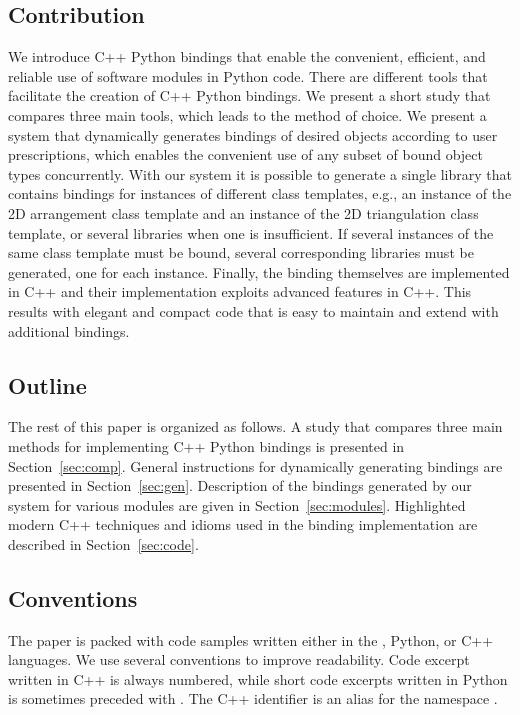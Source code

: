 \subsection{Contribution}
\label{ssec:intro:results}
We introduce C++ Python bindings that enable the convenient,
efficient, and reliable use of \cgal{} software modules in Python
code. There are different tools that facilitate the creation of C++
Python bindings. We present a short study that compares three main
tools, which leads to the method of choice.
%
We present a system that dynamically generates bindings of desired
objects according to user prescriptions, which enables the convenient
use of any subset of bound object types concurrently.  With our system
it is possible to generate a single library that contains bindings for
instances of different \cgal{} class templates, e.g., an instance of
the 2D arrangement class template and an instance of the 2D
triangulation class template, or several libraries when one is
insufficient. If several instances of the same class template must be
bound, several corresponding libraries must be generated, one for each
instance.
%
Finally, the binding themselves are implemented in C++ and their
implementation exploits advanced features in C++. This results with
elegant and compact code that is easy to maintain and extend with
additional bindings.

\subsection{Outline}
\label{ssec:intro:outline}
The rest of this paper is organized as follows. A study that compares
three main methods for implementing C++ Python bindings is presented
in Section~\ref{sec:comp}. General instructions for dynamically
generating bindings are presented in Section~\ref{sec:gen}.
Description of the bindings generated by our system for various
modules are given in Section~\ref{sec:modules}. Highlighted modern C++
techniques and idioms used in the binding implementation are described
in Section~\ref{sec:code}.

\subsection{Conventions}
\label{ssec:intro:conventions}
The paper is packed with code samples written either in the \cmake{},
Python, or C++ languages. We use several conventions to improve
readability.  Code excerpt written in C++ is always numbered, while
short code excerpts written in Python is sometimes preceded with
\pyLstinline{>>>}. The C++ identifier  is an alias
for the namespace .
